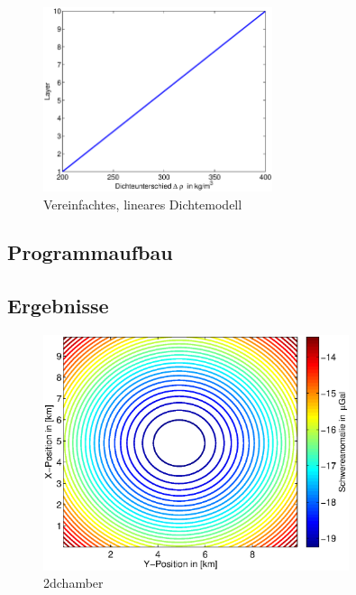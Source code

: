 \documentclass[12pt,a4paper]{scrartcl}
\begin{document}
\begin{figure}[htb]
\centering
\includegraphics[width=0.6\textwidth]{../figures/rho_model}
\caption{Vereinfachtes, lineares Dichtemodell}
\label{rhomodel}
\end{figure}


\subsection*{Programmaufbau}



\subsection*{Ergebnisse}

\begin{figure}[htb]
\centering
\includegraphics[width=0.8\textwidth]{../figures/2dchamber_contour}
\caption{2dchamber}
\label{2dchamber}
\end{figure}
\end{document}
